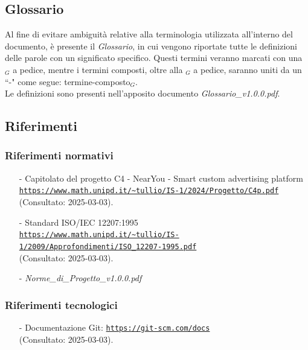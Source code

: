 \documentclass[10pt]{article}
\begin{document}
\begin{justify}
\subsection{Glossario}
Al fine di evitare ambiguità relative alla terminologia utilizzata all'interno del documento, è presente il \textit{Glossario}, in cui vengono riportate tutte le definizioni delle parole con un significato specifico. Questi termini veranno marcati con una $_G$ a pedice, mentre i termini composti, oltre alla $_G$ a pedice, saranno uniti da un ``-" come segue: termine-composto$_G$.\\
Le definizioni sono presenti nell'apposito documento \textit{Glossario\_v1.0.0.pdf}.

\subsection{Riferimenti}

\subsubsection{Riferimenti normativi}
\begin{itemize}
    \item[-] Capitolato del progetto C4 - NearYou - Smart custom advertising platform \\ 
    \textcolor{blue}{\texttt{\url{https://www.math.unipd.it/~tullio/IS-1/2024/Progetto/C4p.pdf}}} \\ 
    (Consultato: 2025-03-03).
    
    \item[-] Standard ISO/IEC 12207:1995 \\ 
    \textcolor{blue}{\texttt{\url{https://www.math.unipd.it/~tullio/IS-1/2009/Approfondimenti/ISO_12207-1995.pdf}}} \\
    (Consultato: 2025-03-03).
    
    \item[-] \textit{Norme\_di\_Progetto\_v1.0.0.pdf}
\end{itemize}

\subsubsection{Riferimenti tecnologici}
\begin{itemize}
    \item[-] Documentazione Git: \textcolor{blue}{\texttt{\url{https://git-scm.com/docs}}} \\
    (Consultato: 2025-03-03).
    

\end{itemize}
\end{justify}
\end{document}
